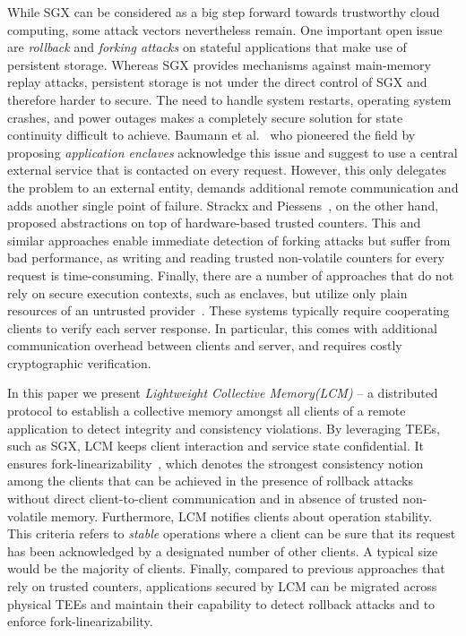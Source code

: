 \documentclass[11pt]{article}
\theoremstyle{plain-boldhead}
\theoremstyle{definition-boldhead}
\newcommand{\pproj}{Lightweight Collective Memory\xspace}
\newcommand{\pp}{LCM\xspace}
\begin{document}
While SGX can be considered as a big step forward towards trustworthy cloud computing, some attack vectors nevertheless remain. 
One important open issue are \emph{rollback} and \emph{forking attacks} on stateful applications that make use of persistent storage. 
Whereas SGX provides mechanisms against main-memory replay attacks, persistent storage is not under the direct control of SGX and therefore harder to secure.
The need to handle system restarts, operating system crashes, and power outages makes a completely secure solution for state continuity difficult to achieve.
Baumann et al.~\cite{baumann2014} who pioneered the field by proposing \emph{application enclaves} acknowledge this issue and suggest to use a central external service that is contacted on every request. 
However, this only delegates the problem to an external entity, demands additional remote communication and adds another single point of failure.
Strackx and Piessens~\cite{strpie16}, on the other hand, proposed abstractions on top of hardware-based trusted counters. 
This and similar approaches \cite{chun2007,levin2009,parno2011,strpie16} enable immediate detection of forking attacks but suffer from bad performance, as writing and reading trusted non-volatile counters for every request is time-consuming.
Finally, there are a number of approaches that do not rely on secure execution contexts, such as enclaves, but utilize only plain resources of an untrusted provider~\cite{brcakn15,cakesh11,cacohr14,fzff10,mazsha02,scckms10}.
% 
These systems typically require cooperating clients to verify each server
response.  In particular, this comes with additional communication
overhead between clients and server, and requires costly
cryptographic verification.

In this paper we present \emph{\pproj (\pp)} -- a distributed protocol to establish a collective memory amongst all clients of a remote application to detect integrity and consistency violations. 
By leveraging  \acp{TEE}, such as SGX, \pp keeps client interaction and service state confidential. 
It ensures fork-linearizability~\cite{mazsha02}, which denotes the strongest consistency notion among the clients that can be achieved in the presence of rollback attacks without direct client-to-client communication and in absence of trusted non-volatile memory. 
Furthermore, \pp notifies clients about operation stability. 
This criteria refers to \emph{stable} operations where a client can be sure that its request has been acknowledged by a designated number of other clients. 
A typical size would be the majority of clients.
Finally, compared to previous approaches that rely on trusted counters,
applications secured by \pp can be migrated across physical TEEs
and maintain their capability
to detect rollback attacks and to enforce fork-linearizability.
\end{document}
